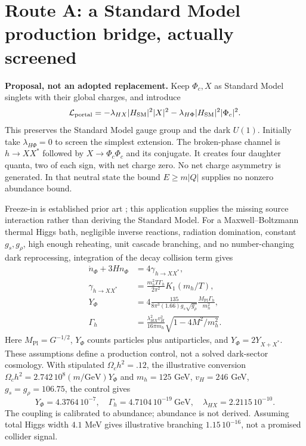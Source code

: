 \documentclass[11pt]{article}
\newcommand{\Pl}{\mathrm{Pl}}
\begin{document}
\section{Route A: a Standard Model production bridge, actually screened}
\textbf{Proposal, not an adopted replacement.} Keep $\Phi_c,X$ as Standard
Model singlets with their global charges, and introduce
\begin{equation}
 \mathcal L_{\rm portal}=-\lambda_{HX}|H_{\rm SM}|^2|X|^2
 -\lambda_{H\Phi}|H_{\rm SM}|^2|\Phi_c|^2.
\end{equation}
This preserves the Standard Model gauge group and the dark $U(1)$. Initially
take $\lambda_{H\Phi}=0$ to screen the simplest extension. The broken-phase
channel is $h\to XX^*$ followed by $X\to\Phi_c\Phi_c$ and its conjugate.
It creates four daughter quanta, two of each sign, with net charge zero.
No net charge asymmetry is generated. In that neutral state the bound
$E\ge m|Q|$ supplies no nonzero abundance bound.

Freeze-in is established prior art \cite{hall}; this application supplies
the missing source interaction rather than deriving the Standard Model.
For a Maxwell--Boltzmann thermal Higgs bath, negligible inverse reactions,
radiation domination, constant $g_s,g_\rho$, high enough reheating, unit
cascade branching, and no number-changing dark reprocessing, integration
of the decay collision term gives
\begin{align}
 \dot n_\Phi+3Hn_\Phi&=4\gamma_{h\to XX^*},\\
 \gamma_{h\to XX^*}&=\frac{m_h^2T\Gamma_h}{2\pi^2}K_1(m_h/T),\\
 Y_\Phi&=4\frac{135}{8\pi^3(1.66)g_s\sqrt{g_\rho}}
 \frac{M_\Pl\Gamma_h}{m_h^2},\\
 \Gamma_h&=\frac{\lambda_{HX}^2 v_H^2}{16\pi m_h}
 \sqrt{1-4M^2/m_h^2}.
\end{align}
Here $M_\Pl=G^{-1/2}$, $Y_\Phi$ counts particles plus antiparticles, and
$Y_\Phi=2Y_{X+X^*}$. These assumptions define a production control, not
a solved dark-sector cosmology. With stipulated $\Omega_c h^2=.12$,
the illustrative conversion $\Omega_c h^2=2.742\,10^8(m/\mathrm{GeV})Y_\Phi$
and $m_h=125$ GeV, $v_H=246$ GeV, $g_s=g_\rho=106.75$, the control gives
\begin{equation}
 Y_\Phi=4.3764\,10^{-7},\quad
 \Gamma_h=4.7104\,10^{-19}\ \mathrm{GeV},\quad
 \lambda_{HX}=2.2115\,10^{-10}.
\end{equation}
The coupling is calibrated to abundance; abundance is not derived.
Assuming total Higgs width $4.1$ MeV gives illustrative branching
$1.15\,10^{-16}$, not a promised collider signal.
\end{document}
